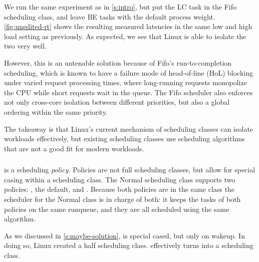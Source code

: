 We run the same experiment as in \autoref{s:intro}, but put the LC task in the
Fifo scheduling class, and leave BE tasks with the default process weight.
\autoref{fig:unedited-rt} shows the resulting measured latencies in the same low
and high load setting as previously. As expected, we see that Linux is able to
isolate the two very well. 

However, this is an untenable solution because of Fifo's run-to-completion
scheduling, which is known to have a failure mode of head-of-line (HoL) blocking
under varied request processing times, where long-running requests monopolize
the CPU while short requests wait in the queue. The Fifo scheduler also enforces
not only cross-core isolation between different priorities, but also a global
ordering within the same priority.

The takeaway is that Linux's current mechanism of scheduling classes can isolate
workloads effectively, but existing scheduling classes use scheduling
algorithms that are not a good fit for modern workloads.

\subsubsection{\schedidle}\label{ss:schedidle}

\schedidle{} is a scheduling \textit{policy}. Policies are not full scheduling
classes, but allow for special casing within a scheduling class. The Normal
scheduling class supports two policies: \schednormal{}, the default, and
\schedidle{}. Because both policies are in the same class the scheduler for the
Normal class is in charge of both: it keeps the tasks of both policies on the
same runqueue, and they are all scheduled using the same algorithm. 

As we discussed in \autoref{s:maybe-solution}, \schedidle{} is special cased,
but only on wakeup. In doing so, Linux created a half scheduling class.
\schedbe{} effectively turns \schedidle{} into a scheduling class.

